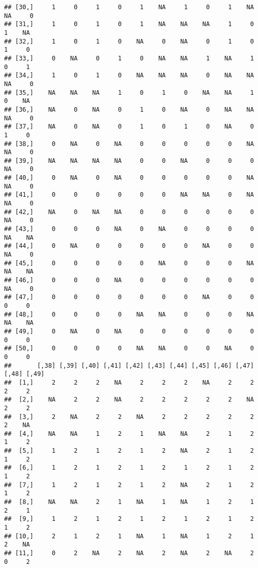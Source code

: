 \documentclass[
]{article}
\begin{document}
\begin{verbatim}
## [30,]     1     0     1     0     1    NA     1     0     1    NA    NA     0
## [31,]     1     0     1     0     1    NA    NA    NA     1     0     1    NA
## [32,]     1     0     1     0    NA     0    NA     0     1     0     1     0
## [33,]     0    NA     0     1     0    NA    NA     1    NA     1     0     1
## [34,]     1     0     1     0    NA    NA    NA     0    NA    NA    NA     0
## [35,]    NA    NA    NA     1     0     1     0    NA    NA     1     0    NA
## [36,]    NA     0    NA     0     1     0    NA     0    NA    NA    NA     0
## [37,]    NA     0    NA     0     1     0     1     0    NA     0     1     0
## [38,]     0    NA     0    NA     0     0     0     0     0    NA    NA     0
## [39,]    NA    NA    NA    NA     0     0    NA     0     0     0    NA     0
## [40,]     0    NA     0    NA     0     0     0     0     0    NA    NA     0
## [41,]     0     0     0     0     0     0    NA    NA     0    NA    NA     0
## [42,]    NA     0    NA    NA     0     0     0     0     0     0    NA     0
## [43,]     0     0     0    NA     0    NA     0     0     0     0    NA    NA
## [44,]     0    NA     0     0     0     0     0    NA     0     0    NA     0
## [45,]     0     0     0     0     0    NA     0     0     0    NA    NA    NA
## [46,]     0     0     0    NA     0     0     0     0     0     0    NA     0
## [47,]     0     0     0     0     0     0     0    NA     0     0     0     0
## [48,]     0     0     0     0    NA    NA     0     0     0    NA    NA    NA
## [49,]     0    NA     0    NA     0     0     0     0     0     0     0     0
## [50,]     0     0     0     0    NA    NA     0     0    NA     0     0     0
##       [,38] [,39] [,40] [,41] [,42] [,43] [,44] [,45] [,46] [,47] [,48] [,49]
##  [1,]     2     2     2    NA     2     2     2    NA     2     2     2     2
##  [2,]    NA     2     2    NA     2     2     2     2     2    NA     2     2
##  [3,]     2    NA     2     2    NA     2     2     2     2     2     2    NA
##  [4,]    NA    NA     1     2     1    NA    NA     2     1     2     1     2
##  [5,]     1     2     1     2     1     2    NA     2     1     2     1     2
##  [6,]     1     2     1     2     1     2     1     2     1     2     1     2
##  [7,]     1     2     1     2     1     2    NA     2     1     2     1     2
##  [8,]    NA    NA     2     1    NA     1    NA     1     2     1     2     1
##  [9,]     1     2     1     2     1     2     1     2     1     2     1     2
## [10,]     2     1     2     1    NA     1    NA     1     2     1     2    NA
## [11,]     0     2    NA     2    NA     2    NA     2    NA     2     0     2

\end{verbatim}
\end{document}
